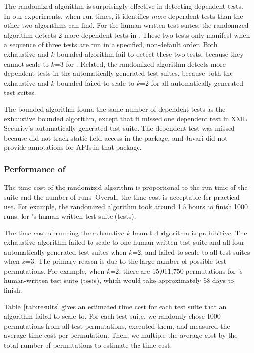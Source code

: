 The randomized algorithm is surprisingly effective in
detecting dependent tests. In our experiments, when run \trialnum times,
it identifies \textit{more} dependent tests than the other
two algorithms can find. For the human-written
test suites, the randomized algorithm detects 2 more dependent
tests in \jt. These two tests only
manifest when a sequence of three tests are run in a specified,
non-default order. Both exhaustive and \dependenceaware{} $k$-bounded
algorithm fail to detect these two tests, because
they cannot scale to $k$=3 for 
\jt. Related, the randomized algorithm
detects more dependent
tests in the automatically-generated test suites,
because both the exhaustive and \dependenceaware{} $k$-bounded
failed to scale to $k$=2 for all automatically-generated test suites.

The \dependenceaware{} bounded algorithm found the same
number of dependent tests as the exhaustive bounded algorithm, except
that it missed one dependent test in XML Security's
automatically-generated test suite.
The dependent test was missed because \ourtool
did not track static field access in the  package,
and Javari did not provide annotations for APIs
in that package.


\subsubsection{Performance of \ourtool}
\label{sec:performance}

The time cost of the randomized algorithm 
is proportional to the run time of the suite and the number of runs.
Overall, the time cost is acceptable for practical use.
For example, the randomized algorithm took around 1.5 hours
to finish 1000 runs,  for \jt's human-written test
suite (\jodatimetests tests).
 
The time cost of running the exhaustive $k$-bounded algorithm
is prohibitive. The exhaustive algorithm failed to
scale to one human-written test suite and all four automatically-generated
test suites when $k$=2, and failed to scale to all test suites
when $k$=3. The primary reason is due to the large
number of possible test permutations. 
For example, when $k$=2, there are 15,011,750 permutations
for \jt's human-written test suite (\jodatimetests tests),
which would take approximately 58 days to finish.

Table~\ref{tab:results} gives an estimated time cost for each
test suite that an algorithm failed to scale to. For each test suite,
we randomly chose 1000 permutations from all
test permutations, executed them, and measured the average time cost
per permutation. Then, we multiple
the average cost by the total number of permutations to estimate
the time cost.

